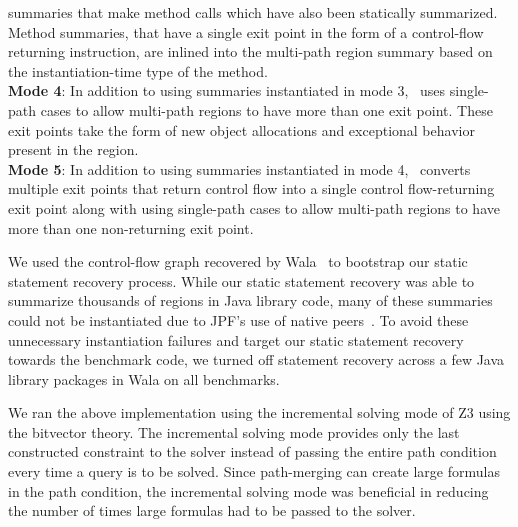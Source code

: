 summaries that make method calls which have also been statically summarized.
%
Method summaries, that have a single exit point in the form of a control-flow returning instruction, are inlined into
the multi-path region summary based on the instantiation-time type of the method.\\
%
\textbf{Mode 4}: In addition to using summaries instantiated in mode 3, \tool\ uses single-path cases to allow
multi-path regions to have more than one exit point.
%
These exit points take the form of new object allocations and exceptional behavior present in the region.\\
%
\textbf{Mode 5}: In addition to using summaries instantiated in mode 4, \tool\ converts multiple exit points that return
control flow into a single control flow-returning exit point along with using single-path
cases to allow multi-path regions to have more than one non-returning exit point.

We used the control-flow graph recovered by Wala~\cite{Wala} to bootstrap our static statement recovery process.
%
While our static statement recovery was able to summarize thousands of regions in Java library code, many of these
summaries could not be instantiated due to JPF\rq s use of native peers~\cite{jpf-mji}.
%
To avoid these unnecessary instantiation failures and target our static statement recovery towards the benchmark code,
we turned off statement recovery across a few Java library packages in Wala on all benchmarks.

We ran the above implementation using the incremental solving mode of Z3 using the bitvector theory.
%
The incremental solving mode provides only the last constructed constraint to the solver instead of passing the entire
path condition every time a query is to be solved.
%
Since path-merging can create large formulas in the path condition, the incremental solving mode was beneficial in
reducing the number of times large formulas had to be passed to the solver.
%
